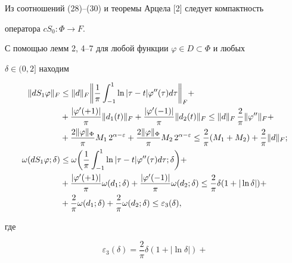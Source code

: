 \begin{pf}
\begin{equation}
\end{equation} 


Из соотношений (28)--(30) и теоремы Арцела [2] следует компактность 


оператора $c S_0:\Phi\to F$. 


 


С помощью лемм 2, 4--7 для любой функции $\varphi\in D\subset\Phi$ и любых 


$\delta\in(0,2]$ находим 


\begin{align} 


\|d S_1\varphi\|_F&\le\|d\|_F\bigg\|\frac{1}{\pi}\int^1_{-1} 


\ln|\tau-t|\varphi''(\tau)d\tau\bigg\|_F+\notag \\ 


&+\frac{|\varphi'(+1)|}{\pi}\|d_1(t)\|_F+ 


\frac{|\varphi'(-1)|}{\pi}\|d_2(t)\|_F\le \|d\|_F\, 


\frac{2}{\pi}\|\varphi''\|_F+\notag \\ 


&+\frac{2\|\varphi\|_\Phi}{\pi}M_1\,2^{\alpha-\varepsilon} 


+\frac{2\|\varphi\|_\Phi}{\pi}M_2\,2^{\alpha-\varepsilon}\le 


\frac{2}{\pi}(M_1+M_2)+\frac{2}{\pi}\|d\|_F;\\ 


% 


\omega(d S_1\varphi;\delta)&\le \omega\bigg(\frac{1}{\pi} 


\int^1_{-1}\ln|\tau-t|\varphi''(\tau)d\tau;\delta\bigg)+\notag \\ 


&+\frac{|\varphi'(+1)|}{\pi}\omega(d_1;\delta)+ 


\frac{|\varphi'(-1)|}{\pi}\omega(d_2;\delta)\le\frac{2}{\pi} 


\delta(1+|\ln\delta|)+\notag \\ 


&+\frac{2}{\pi}\omega(d_1;\delta)+\frac{2}{\pi} 


\omega(d_2;\delta)\le\varepsilon_3(\delta), 


\end{align} 


где 


\begin{equation} 


\varepsilon_3(\delta)=\frac{2}{\pi}\delta(1+|\ln\delta|)+ 



\end{equation}
\end{pf}
